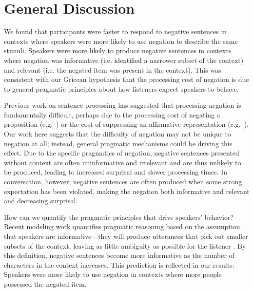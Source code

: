 \documentclass[man, noapacite]{apa2}
\begin{document}
\section{General Discussion}

We found that participants were faster to respond to negative sentences in contexts where speakers were more likely to use negation to describe the same stimuli.  Speakers were more likely to produce negative sentences in contexts where negation was informative (i.e. identified a narrower subset of the context) and relevant (i.e. the negated item was present in the context).  This was consistent with our Gricean hypothesis that the processing cost of negation is due to general pragmatic principles about how listeners expect speakers to behave.  

Previous work on sentence processing has suggested that processing negation is fundamentally difficult, perhaps due to the processing cost of negating a proposition (e.g.\ ) or the cost of suppressing an affirmative representation (e.g.\ ).  Our work here suggests that the difficulty of negation may not be unique to negation at all; instead, general pragmatic mechanisms could be driving this effect.  Due to the specific pragmatics of negation, negative sentences presented without context are often uninformative and irrelevant and are thus unlikely to be produced, leading to increased surprisal and slower processing times.  In conversation, however, negative sentences are often produced when some strong expectation has been violated, making the negation both informative and relevant and decreasing surprisal.  

How can we quantify the pragmatic principles that drive speakers' behavior?  Recent modeling work quantifies pragmatic reasoning based on the assumption that speakers are informative---they will produce utterances that pick out smaller subsets of the context, leaving as little ambiguity as possible for the listener \cite{frank2012,goodman2013}.  By this definition, negative sentences become more informative as the number of characters in the context increases.  This prediction is reflected in our results: Speakers were more likely to use negation in contexts where more people possessed the negated item.  
\end{document}

